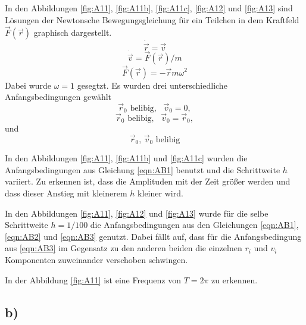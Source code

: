     In den Abbildungen \ref{fig:A11}, \ref{fig:A11b}, \ref{fig:A11c}, \ref{fig:A12} und \ref{fig:A13} sind Lösungen der
    Newtonsche Bewegungsgleichung für ein Teilchen in dem Kraftfeld $\vec{F}(\vec{r})$ graphisch
    dargestellt.
    \begin{equation}
      \dot{\vec{r}} = \vec{v}
    \end{equation}
    \begin{equation}
      \dot{\vec{v}}= \vec{F}(\vec{r})/m
    \end{equation}
    \begin{equation}
      \vec{F}(\vec{r}) = - \vec{r} m \omega^2
    \end{equation}
    Dabei wurde $\omega=1$ gesegtzt.
    Es wurden drei unterschiedliche Anfangsbedingungen gewählt
    \begin{equation}
      \vec{r}_0 \text{ belibig},\,\,\,\, \vec{v}_0=0,
      \label{eqn:AB1}
    \end{equation}
    \begin{equation}
      \vec{r}_0\text{ belibig},\,\,\,\,  \vec{v}_0= \vec{r}_0,
      \label{eqn:AB2}
    \end{equation}
    und
    \begin{equation}
      \vec{r}_0,\, \vec{v}_0 \text{ belibig}
      \label{eqn:AB3}
    \end{equation}

    In den Abbildungen \ref{fig:A11}, \ref{fig:A11b} und \ref{fig:A11c} wurden
    die Anfangsbedingungen aus Gleichung \ref{eqn:AB1} benutzt und die Schrittweite $h$ variiert.
    Zu erkennen ist, dass die Amplituden mit der Zeit größer werden und dass dieser
    Anstieg mit kleinerem $h$ kleiner wird.

    In den Abbildungen \ref{fig:A11},  \ref{fig:A12} und \ref{fig:A13} wurde
    für die selbe Schrittweite $h=1/100$ die Anfangsbedingungen aus
    den Gleichungen \ref{eqn:AB1}, \ref{eqn:AB2} und \ref{eqn:AB3} genutzt.
    Dabei fällt auf, dass für die Anfangsbedingung aus \ref{eqn:AB3} im Gegensatz
    zu den anderen beiden die einzelnen $r_i$ und $v_i$ Komponenten zuweinander
    verschoben schwingen.

    In der Abbildung \ref{fig:A11} ist eine Frequenz von $T= 2\pi$ zu erkennen.


  \subsection*{b)}

